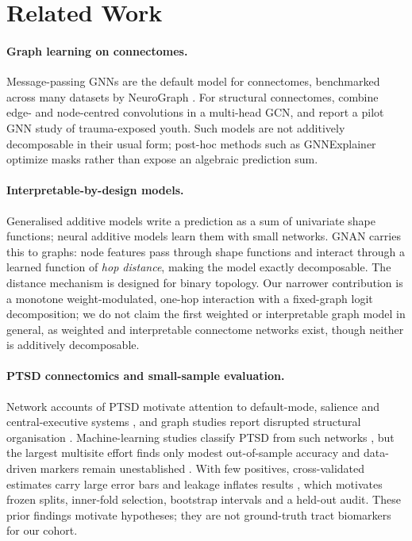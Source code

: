 \section{Related Work}
\label{sec:related}

\paragraph{Graph learning on connectomes.}
Message-passing GNNs \citep{kipf2017gcn,velickovic2018gat} are the default model for connectomes,
benchmarked across many datasets by NeuroGraph \citep{said2023neurograph}. For structural
connectomes, \citet{kazi2024multihead} combine edge- and node-centred convolutions in a multi-head
GCN, and \citet{jeong2025gcnptsd} report a pilot GNN study of trauma-exposed youth. Such models are
not additively decomposable in their usual form; post-hoc methods such as GNNExplainer
\citep{ying2019gnnexplainer} optimize masks rather than expose an algebraic prediction sum.

\paragraph{Interpretable-by-design models.}
Generalised additive models \citep{hastie1986gam} write a prediction as a sum of univariate shape
functions; neural additive models \citep{agarwal2021nam} learn them with small networks. GNAN
\citep{bechler2024gnan} carries this to graphs: node features pass through shape functions and
interact through a learned function of \emph{hop distance}, making the model exactly decomposable.
The distance mechanism is designed for binary topology. Our narrower contribution is a monotone
weight-modulated, one-hop interaction with a fixed-graph logit decomposition; we do not claim the
first weighted or interpretable graph model in general, as weighted \citep{kawahara2017brainnetcnn} and interpretable
\citep{li2021braingnn} connectome networks exist, though neither is additively decomposable.

\paragraph{PTSD connectomics and small-sample evaluation.}
Network accounts of PTSD motivate attention to default-mode, salience and central-executive systems
\citep{menon2011triplenetwork,akiki2017network}, and graph studies report disrupted structural
organisation \citep{suo2017smallworld}. Machine-learning studies classify PTSD from such networks
\citep{nicholson2020ptsdml}, but the largest multisite effort finds only modest out-of-sample
accuracy \citep{zhu2023enigma} and data-driven markers remain unestablished
\citep{neria2022datadriven}. With few positives, cross-validated estimates carry large error bars
\citep{varoquaux2018cvfailure} and leakage inflates results \citep{kapoor2023leakage}, which
motivates frozen splits, inner-fold selection, bootstrap intervals and a held-out audit. These prior
findings motivate hypotheses; they are not ground-truth tract biomarkers for our cohort.
